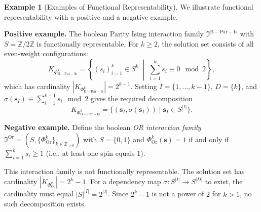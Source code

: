 \documentclass[11pt,reqno]{amsart}
\newcommand{\vecs}{\boldsymbol{s}}
\newcommand{\IFam}{\mathfrak{I}}
\newcommand{\mcib}{\mathfrak{I}^{\mathrm{B-Par-Is}}}
\newcommand{\PhibIs}{\Phi_{\mathrm{B-Par-Is}}}
\theoremstyle{plain}
\theoremstyle{definition}
\newtheorem{example}[theorem]{Example}
\numberwithin{equation}{section}
\begin{document}
\begin{example}[Examples of Functional Representability]
\label{ex:func_repr}
    We illustrate functional representability with a positive and a negative example.
    
    \textbf{Positive example.} The boolean Parity Ising interaction family $\mcib$ with $S = \mathbb{Z}/2\mathbb{Z}$ is functionally representable. For $k \geq 2$, the solution set consists of all even-weight configurations:
    \[
    K_{\PhibIs^k} = \left\{ (s_i)_{i=1}^k \in S^k \;\middle|\; \sum_{i=1}^k s_i \equiv 0 \mod{2} \right\},
    \]
    which has cardinality $|K_{\PhibIs^k}| = 2^{k-1}$. Setting $I = \{1, \ldots, k-1\}$, $D = \{k\}$, and $\sigma(\vecs_I) \equiv \sum_{i=1}^{k-1} s_i \mod{2}$ gives the required decomposition
    \[
    K_{\PhibIs^k} = \{ (\vecs_I, \sigma(\vecs_I)) \mid \vecs_I \in S^{|I|} \}.
    \]

    \textbf{Negative example.} Define the boolean \emph{OR interaction family} $\IFam^{\mathrm{Or}} = (S, \{\Phi_{\mathrm{Or}}^k\}_{k \in \mathbb{Z}_{\geq 0}})$ with $S = \{0,1\}$ and $\Phi_{\mathrm{Or}}^k(\vecs) = 1$ if and only if $\sum_{i=1}^k s_i \geq 1$ (i.e., at least one spin equals $1$).
    
    This interaction family is not functionally representable. The solution set has cardinality $|K_{\Phi^k_{\mathrm{Or}}}| = 2^k - 1$. For a dependency map $\sigma \colon S^{|I|} \to S^{|D|}$ to exist, the cardinality must equal $|S|^{|I|} = 2^{|I|}$. Since $2^k - 1$ is not a power of $2$ for $k > 1$, no such decomposition exists.
\end{example}
\end{document}
